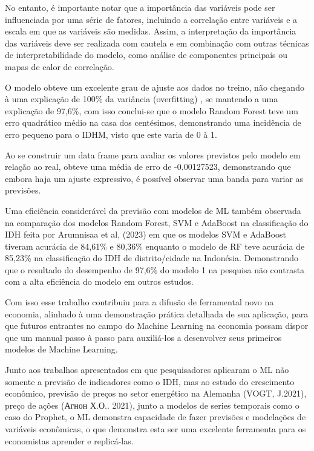 \documentclass[
]{article}
\begin{document}
No entanto, é importante notar que a importância das variáveis pode ser
influenciada por uma série de fatores, incluindo a correlação entre
variáveis e a escala em que as variáveis são medidas. Assim, a
interpretação da importância das variáveis deve ser realizada com
cautela e em combinação com outras técnicas de interpretabilidade do
modelo, como análise de componentes principais ou mapas de calor de
correlação.

O modelo obteve um excelente grau de ajuste aos dados no treino, não
chegando à uma explicação de 100\% da variância (overfitting) , se
mantendo a uma explicação de 97,6\%, com isso conclui-se que o modelo
Random Forest teve um erro quadrático médio na casa dos centésimos,
demonstrando uma incidência de erro pequeno para o IDHM, visto que este
varia de 0 à 1.

Ao se construir um data frame para avaliar os valores previstos pelo
modelo em relação ao real, obteve uma média de erro de -0.00127523,
demonstrando que embora haja um ajuste expressivo, é possível observar
uma banda para variar as previsões.

Uma eficiência considerável da previsão com modelos de ML também
observada na comparação dos modelos Random Forest, SVM e AdaBoost na
classificação do IDH feita por Arumnisaa et al, (2023) em que os modelos
SVM e AdaBoost tiveram acurácia de 84,61\% e 80,36\% enquanto o modelo
de RF teve acurácia de 85,23\% na classificação do IDH de
distrito/cidade na Indonésia. Demonstrando que o resultado do desempenho
de 97,6\% do modelo 1 na pesquisa não contrasta com a alta eficiência do
modelo em outros estudos.

Com isso esse trabalho contribuiu para a difusão de ferramental novo na
economia, alinhado à uma demonstração prática detalhada de sua
aplicação, para que futuros entrantes no campo do Machine Learning na
economia possam dispor que um manual passo à passo para auxiliá-los a
desenvolver seus primeiros modelos de Machine Learning.

Junto aos trabalhos apresentados em que pesquisadores aplicaram o ML não
somente a previsão de indicadores como o IDH, mas ao estudo do
crescimento econômico, previsão de preços no setor energético na
Alemanha (VOGT, J.2021), preço de ações (Агнон Х.О.. 2021), junto a
modelos de series temporais como o caso do Prophet, o ML demonstra
capacidade de fazer previsões e modelações de variáveis econômicas, o
que demonstra esta ser uma excelente ferramenta para os economistas
aprender e replicá-las.
\end{document}
